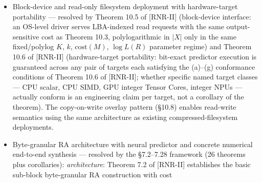 \documentclass[
]{article}
\begin{document}
\begin{itemize}
  non-uniform binary-search entry (full statement in Theorem 10.4). The cost is polylogarithmic in
  archive size $|X|$ only in the parameter regime where the
  sync-point spacing $K$, read window $k$, predictor-evaluation cost
  $\mathrm{cost}(M)$, and $\log L(R)$ are held fixed or grow at most
  polylogarithmically in $|X|$; outside that
  regime (e.g., $K = \Theta(|X|)$ or $k = \Theta(|X|)$) the cost is
  $\Theta(|X| \cdot \mathrm{cost}(M))$. This is the framework's
  deployment-grade distinguishing feature relative to other neural
  compressors: autoregressive byte/pixel models (NNCP, PixelCNN++,
  PixelSNAIL) as currently designed do not insert sync points or
  maintain a seek index and so do not support random access in
  their published form. Adding sync points to their encoders would
  give them Theorem 10.3's random access \emph{provided} the
  underlying predictor is $W$-bounded; for autoregressive
  transformers with fixed context window this holds, but for
  autoregressive RNNs/state-space models (which are not
  $W$-bounded) Theorem 10.4's state snapshots are also required
  per sync point. Block-codec schemes (Bit-Swap, IDF++, HiLLoC)
  provide only block-granular access (not byte-granular) due to
  their block-coupled latent/ANS state.
\item
  Block-device and read-only filesystem deployment with
  hardware-target portability --- resolved by Theorem 10.5 of [RNR-II]
  (block-device interface: an OS-level driver serves LBA-indexed
  read requests with the same output-sensitive cost as Theorem 10.3,
  polylogarithmic in $|X|$ only in the same fixed/polylog $K$, $k$,
  $\mathrm{cost}(M)$, $\log L(R)$ parameter regime) and Theorem 10.6 of [RNR-II] (hardware-target
  portability: bit-exact predictor execution is guaranteed across
  any pair of targets each satisfying the (a)--(g) conformance
  conditions of Theorem 10.6 of [RNR-II]; whether specific named target classes
  --- CPU scalar, CPU SIMD, GPU integer Tensor Cores, integer NPUs
  --- actually conform is an engineering claim per target, not a
  corollary of the theorem). The copy-on-write
  overlay pattern (§10.8) enables read-write semantics using the
  same architecture as existing compressed-filesystem deployments.
\item
  Byte-granular RA architecture with neural predictor and concrete
  numerical end-to-end synthesis --- resolved by the §7.2--7.28
  framework (26 theorems plus corollaries):
  \emph{architecture}: Theorem 7.2 of [RNR-II] establishes the basic sub-block
  byte-granular RA construction with cost

\end{itemize}
\end{document}
